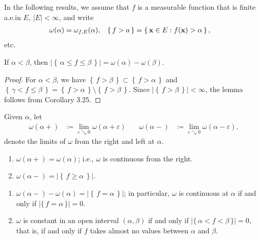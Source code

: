 In the following results, we assume that $f$ is a measurable function that
is finite a.e.\@ in $E$, $|E|<\infty$, and write
\[
\begin{aligned}
\omega(\alpha)&=\omega_{f,E}(\alpha),&\left\{\,f>a\,\right\}&=\left\{\,\mathbf{x}\in
  E:f(\mathbf{x})>\alpha\,\right\},
\end{aligned}
\]
etc.
\begin{lemma}[5.38]
If $\alpha<\beta$, then $\left|\left\{\,\alpha\leq
    f\leq\beta\,\right\}\right|=\omega(\alpha)-\omega(\beta)$.
\end{lemma}
\begin{proof}
For $\alpha<\beta$, we have
$\left\{\,f>\beta\,\right\}\subset\left\{\,f>\alpha\,\right\}$ and
$\left\{\,\gamma<f\leq\beta\,\right\}=\left\{
  \,f>\alpha\,\right\}\setminus\left\{ \,f>\beta\,\right\}$. Since
$\left|\left\{\,f>\beta\,\right\}\right|<\infty$, the lemma follows from
Corollary 3.25.
\end{proof}

Given $\alpha$, let
\[
  \begin{aligned}
    \omega(\alpha{+})&\coloneqq\lim_{\varepsilon\searrow
      0}\omega(\alpha+\varepsilon)\quad&
    \omega(\alpha{-})&\coloneqq\lim_{\varepsilon\searrow 0}\omega(\alpha-\varepsilon).
  \end{aligned}
\]
denote the limits of $\omega$ from the right and left at $\alpha$.

\begin{lemma}[5.39]
\hfill
\begin{enumerate}[label=\textnormal{(\alph*)},noitemsep]
\item $\omega(\alpha+)=\omega(\alpha)$; i.e., $\omega$ is continuous from
  the right.
\item $\omega(\alpha-)=\left|\left\{\,f\geq\alpha\,\right\}\right|$.
\end{enumerate}
\end{lemma}

\begin{corollary}[5.40]
\hfill
\begin{enumerate}[label=\textnormal{(\alph*)},noitemsep]
\item
  $\omega(\alpha-)-\omega(\alpha)=\left|\left\{\,f=\alpha\,\right\}\right|$;
  in particular, $\omega$ is continuous at $\alpha$ if and only if
  $\left|\{\,f=\alpha\,\}\right|=0$.
\item $\omega$ is constant in an open interval $(\alpha,\beta)$ if and only
  if $\left|\{\,\alpha<f<\beta\,\}\right|=0$, that is, if and only if $f$
  takes almost no values between $\alpha$ and $\beta$.
\end{enumerate}
\end{corollary}

